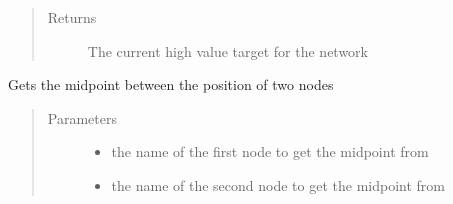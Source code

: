 \documentclass[letterpaper,10pt,english]{sphinxmanual}
\begin{document}
\begin{fulllineitems}

\begin{fulllineitems}
\label{\detokenize{source/yawning_titan.envs.generic.core:yawning_titan.envs.generic.core.network_interface.NetworkInterface.get_high_value_target}}\begin{quote}\begin{description}
\item[{Returns}] \leavevmode
\sphinxAtStartPar
The current high value target for the network

\end{description}\end{quote}

\end{fulllineitems}


\begin{fulllineitems}
\label{\detokenize{source/yawning_titan.envs.generic.core:yawning_titan.envs.generic.core.network_interface.NetworkInterface.get_midpoint}}
\sphinxAtStartPar
Gets the midpoint between the position of two nodes
\begin{quote}\begin{description}
\item[{Parameters}] \leavevmode\begin{itemize}
\item {}
\sphinxAtStartPar
{} \textendash{} the name of the first node to get the midpoint from

\item {}
\sphinxAtStartPar
{} \textendash{} the name of the second node to get the midpoint from


\end{itemize}
\end{description}
\end{quote}
\end{fulllineitems}
\end{fulllineitems}
\end{document}
